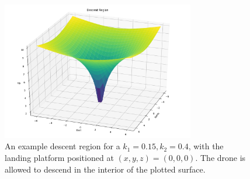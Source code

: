 \begin{figure}[h]
    \centering
    \includegraphics[width=0.75\textwidth]{images/descent_region.png}
    \caption[Example descent region.]{An example descent region for a $k_1=0.15, k_2=0.4$, with the landing platform positioned at $(x,y,z)=(0, 0, 0)$. The drone is allowed to descend in the interior of the plotted surface.}
    \label{fig:descent_region}
\end{figure}

